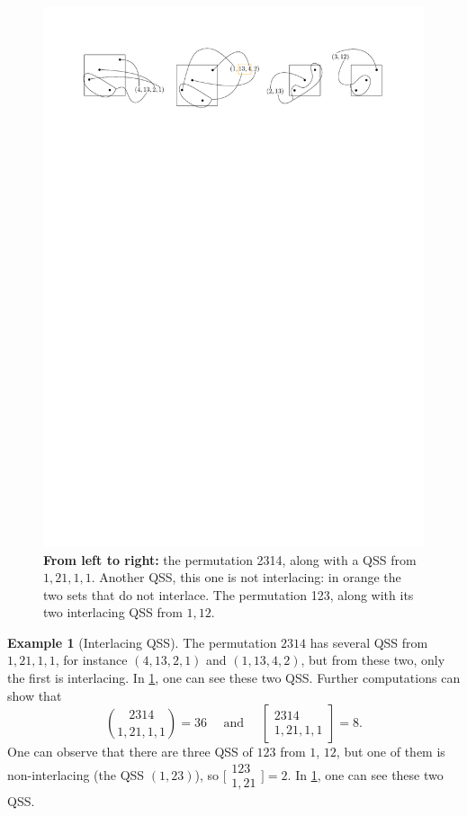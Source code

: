 \documentclass[submission]{FPSAC2023}
\theoremstyle{definition}
\newtheorem{smpl}[thm]{Example}
\begin{document}
\begin{figure}[h]
    \centering
    \includegraphics[scale=1]{../images/interlacing_25314.pdf}
    \caption{\textbf{From left to right:} the permutation 2314, along with a QSS from $1, 21, 1, 1$. Another QSS, this one is not interlacing: in orange the two sets that do not interlace. The permutation 123, along with its two interlacing QSS from $1, 12$.\label{fig:interlacingQSSsmpl}}
\end{figure}

\vspace{-.2in}

\begin{smpl}[Interlacing QSS]
The permutation $2314$ has several QSS from $1, 21, 1, 1$, for instance $(4, 13, 2, 1)$ and $(1, 13, 4, 2)$, but from these two, only the first is interlacing.
In \cref{fig:interlacingQSSsmpl}, one can see these two QSS.
Further computations can show that
\[\binom{2314}{1, 21, 1, 1} = 36 \quad \text{ and } \quad \begin{bmatrix}
2314 \\ 1, 21, 1, 1
\end{bmatrix} = 8.\]
One can observe that there are three QSS of $123$ from $1$, $12$, but one of them is non-interlacing (the QSS $(1,23)$), so
$\bigl[\!\begin{smallmatrix} 123 \\ 1, 21 \end{smallmatrix}\!\bigr] = 2$.
In \cref{fig:interlacingQSSsmpl}, one can see these two QSS.
\end{smpl}
\end{document}
